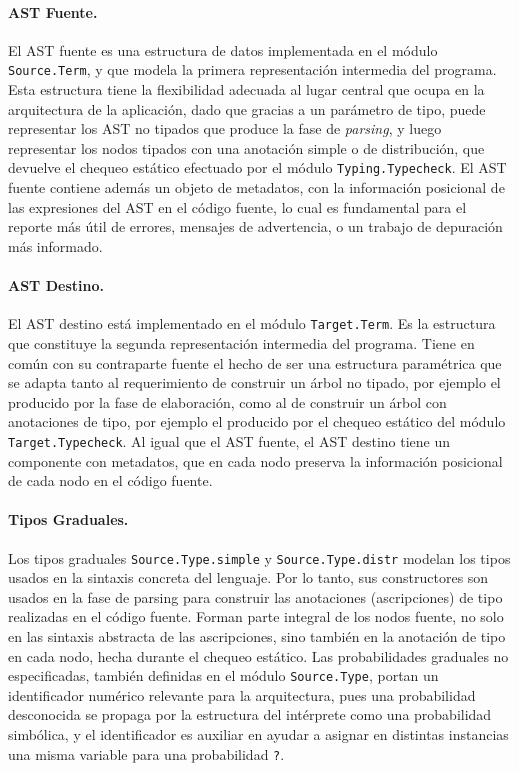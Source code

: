 \paragraph{AST Fuente.}
El AST fuente es una estructura de datos implementada en el módulo
\verb|Source.Term|, y que modela la primera representación intermedia
del programa. Esta estructura tiene la flexibilidad adecuada al lugar
central que ocupa en la arquitectura de la aplicación, dado que
gracias a un parámetro de tipo, puede representar los AST no tipados
que produce la fase de \emph{parsing}, y luego representar los nodos
tipados con una anotación simple o de distribución, que devuelve el
chequeo estático efectuado por el módulo \verb|Typing.Typecheck|. El
AST fuente contiene además un objeto de metadatos, con la información
posicional de las expresiones del AST en el código fuente, lo cual es
fundamental para el reporte más útil de errores, mensajes de advertencia,
o un trabajo de depuración más informado.

\paragraph{AST Destino.}
El AST destino está implementado en el módulo \verb|Target.Term|. Es
la estructura que constituye la segunda representación intermedia del
programa.  Tiene en común con su contraparte fuente el hecho de ser
una estructura paramétrica que se adapta tanto al requerimiento de
construir un árbol no tipado, por ejemplo el producido por la fase de
elaboración, como al de construir un árbol con anotaciones de tipo,
por ejemplo el producido por el chequeo estático del módulo
\verb|Target.Typecheck|. Al igual que el AST fuente, el AST destino
tiene un componente con metadatos, que en cada nodo preserva la
información posicional de cada nodo en el código fuente.


\paragraph{Tipos Graduales.} Los tipos graduales
\verb|Source.Type.simple| y \verb|Source.Type.distr| modelan los tipos
usados en la sintaxis concreta del lenguaje. Por lo tanto, sus
constructores son usados en la fase de parsing para construir las
anotaciones (ascripciones) de tipo realizadas en el código fuente.
Forman parte integral de los nodos fuente, no solo en las sintaxis
abstracta de las ascripciones, sino también en la anotación de tipo en
cada nodo, hecha durante el chequeo estático. Las probabilidades
graduales no especificadas, también definidas en el módulo
\verb|Source.Type|, portan un identificador numérico
relevante para la arquitectura, pues una probabilidad desconocida se
propaga por la estructura del intérprete como una probabilidad
simbólica, y el identificador es auxiliar en ayudar a asignar en distintas
instancias una misma variable para una probabilidad \verb|?|.

